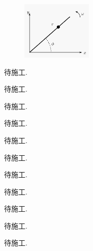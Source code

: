 \begin{figure}[h]
	\centering
	\includegraphics[width=0.3\textwidth]{content/Figures/5-7}
	\caption{ }
	\label{fig:5-7}
\end{figure}
	
\begin{solution}
	待施工.
\end{solution}



\problem{}
\begin{solution}
	待施工.
\end{solution}



\problem{}
\begin{solution}
	待施工.
\end{solution}



\problem{}
\begin{solution}
	待施工.
\end{solution}



\problem{}
\begin{solution}
	待施工.
\end{solution}



\problem{}
\begin{solution}
	待施工.
\end{solution}



\problem{}
\begin{solution}
	待施工.
\end{solution}



\problem{}
\begin{solution}
	待施工.
\end{solution}



\problem{}
\begin{solution}
	待施工.
\end{solution}



\problem{}
\begin{solution}
	待施工.
\end{solution}



\problem{}
\begin{solution}
	待施工.
\end{solution}


